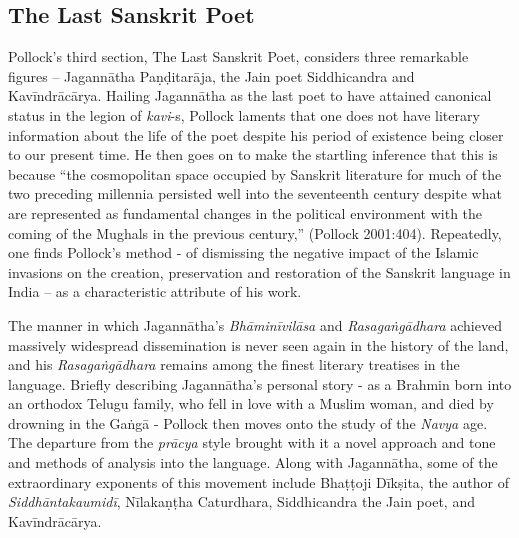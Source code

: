 \subsection{The Last Sanskrit Poet}

Pollock’s third section, The Last Sanskrit Poet, considers three remarkable figures – Jagannātha Paṇḍitarāja, the Jain poet Siddhicandra and Kavīndrācārya. Hailing Jagannātha as the last poet to have attained canonical status in the legion of {\sl kavi}-s, Pollock laments that one does not have literary information about the life of the poet despite his period of existence being closer to our present time. He then goes on to make the startling inference that this is because “the cosmopolitan space occupied by Sanskrit literature for much of the two preceding millennia persisted well into the seventeenth century despite what are represented as fundamental changes in the political environment with the coming of the Mughals in the previous century,” (Pollock 2001:404). Repeatedly, one finds Pollock’s method - of dismissing the negative impact of the Islamic invasions on the creation, preservation and restoration of the Sanskrit language in India – as a characteristic attribute of his work.

The manner in which Jagannātha’s {\sl Bhāminīvilāsa} and {\sl Rasagaṅgādhara} achieved massively widespread dissemination is never seen again in the history of the land, and his {\sl Rasagaṅgādhara} remains among the finest literary treatises in the language. Briefly describing Jagannātha’s personal story - as a Brahmin born into an orthodox Telugu family, who fell in love with a Muslim woman, and died by drowning in the Gaṅgā - Pollock then moves onto the study of the {\sl Navya} age. The departure from the {\sl prācya} style brought with it a novel approach and tone and methods of analysis into the language. Along with Jagannātha, some of the extraordinary exponents of this movement include Bhaṭṭoji Dīkṣita, the author of {\sl Siddhāntakaumidī}, Nīlakaṇṭha Caturdhara, Siddhicandra the Jain poet, and Kavīndrācārya.

